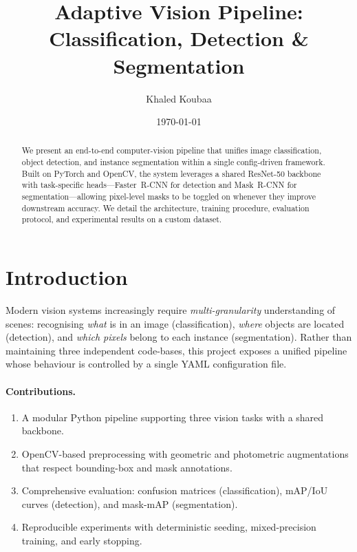 \documentclass[11pt,a4paper]{article}
\title{Adaptive Vision Pipeline:\\
       Classification, Detection \& Segmentation}
\author{Khaled Koubaa}
\date{\today}
\begin{document}
\maketitle

\begin{abstract}
We present an end-to-end computer-vision pipeline that unifies image
classification, object detection, and instance segmentation within a single
config-driven framework.  Built on PyTorch and OpenCV, the system leverages a
shared ResNet-50 backbone with task-specific heads—Faster~R-CNN for detection
and Mask~R-CNN for segmentation—allowing pixel-level masks to be toggled on
whenever they improve downstream accuracy.  We detail the architecture,
training procedure, evaluation protocol, and experimental results on a custom
dataset.
\end{abstract}

\section{Introduction}
\label{sec:intro}

Modern vision systems increasingly require \emph{multi-granularity}
understanding of scenes: recognising \emph{what} is in an image
(classification), \emph{where} objects are located (detection), and
\emph{which pixels} belong to each instance (segmentation).  Rather than
maintaining three independent code-bases, this project exposes a unified
pipeline whose behaviour is controlled by a single YAML configuration file.

\paragraph{Contributions.}
\begin{enumerate}[nosep]
  \item A modular Python pipeline supporting three vision tasks with a shared
        backbone.
  \item OpenCV-based preprocessing with geometric and photometric
        augmentations that respect bounding-box and mask annotations.
  \item Comprehensive evaluation: confusion matrices (classification),
        mAP/IoU curves (detection), and mask-mAP (segmentation).
  \item Reproducible experiments with deterministic seeding, mixed-precision
        training, and early stopping.
\end{enumerate}
\end{document}
